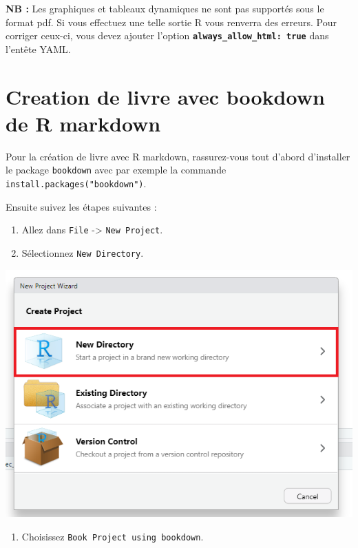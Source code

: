 \documentclass[
  12pt,
]{article}
\providecommand{\tightlist}{%
  \setlength{\itemsep}{0pt}\setlength{\parskip}{0pt}}
\begin{document}
\textbf{NB :} Les graphiques et tableaux dynamiques ne sont pas
supportés sous le format pdf. Si vous effectuez une telle sortie R vous
renverra des erreurs. Pour corriger ceux-ci, vous devez ajouter l'option
\textbf{\texttt{always\_allow\_html:\ true}} dans l'entête YAML.

\newpage

\section{Creation de livre avec bookdown de R
markdown}\label{creation-de-livre-avec-bookdown-de-r-markdown}

Pour la création de livre avec R markdown, rassurez-vous tout d'abord
d'installer le package \texttt{bookdown} avec par exemple la commande
\texttt{install.packages("bookdown")}.

Ensuite suivez les étapes suivantes :

\begin{enumerate}
\def\labelenumi{\arabic{enumi}.}
\item
  Allez dans \texttt{File} -\textgreater{} \texttt{New\ Project}.
\item
  Sélectionnez \texttt{New\ Directory}.
\end{enumerate}

\begin{center}\includegraphics[width=0.7\linewidth,height=0.7\textheight]{../Document_Rmarkdown/Images_creation_livres/New_directory} \end{center}

\begin{enumerate}
\def\labelenumi{\arabic{enumi}.}
\setcounter{enumi}{2}
\tightlist
\item
  Choisissez \texttt{Book\ Project\ using\ bookdown}.
\end{enumerate}
\end{document}
